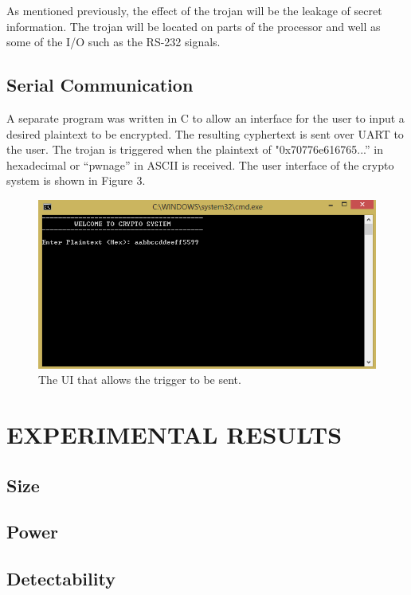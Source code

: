 \documentclass[letterpaper, 10 pt, conference]{ieeeconf}  %
\begin{document}
As mentioned previously, the effect of the trojan will be the leakage of secret information.  The trojan will be located on parts of the processor and well as some of the I/O such as the RS-232 signals.

\subsection{Serial Communication}

A separate program was written in C to allow an interface for the user to input a desired plaintext to be encrypted.  The resulting cyphertext is sent over UART to the user.  The trojan is triggered when the plaintext of "0x70776e616765...” in hexadecimal or “pwnage” in ASCII is received.  The user interface of the crypto system is shown in Figure 3.

\begin{figure}[thpb]
	\centering
	\includegraphics[scale=.50]{SerialProg}
   \caption{The UI that allows the trigger to be sent.}
\end{figure}
  
\section{EXPERIMENTAL RESULTS}

\subsection{Size}

\subsection{Power}

\subsection{Detectability}
\end{document}
